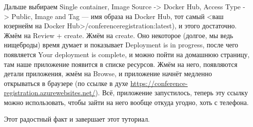 \documentclass[a5paper]{article}
\begin{document}
Дальше выбираем Single container, Image Source -> Docker Hub, Access Type -> Public, Image and Tag --- имя образа на Docker Hub, тот самый <ваш юзернейм на Docker Hub>/conferenceregistration:latest), и этого достаточно. Жмём на Review + create. Жмём на create. Оно некоторое (долгое, мы ведь нищеброды) время думает и показывает Deployment is in progress, после чего появляется Your deployment is complete, и можно пойти на домашнюю страницу, там наше приложение появится в списке ресурсов. Жмём на него, появляются детали приложения, жмём на Browse, и приложение начнёт медленно открываться в браузере (по ссылке в духе \url{https://conference-registration.azurewebsites.net/}). Всё, приложение запустилось, теперь эту ссылку можно использовать, чтобы зайти на него вообще откуда угодно, хоть с телефона. 

Этот радостный факт и завершает этот туториал.
\end{document}
